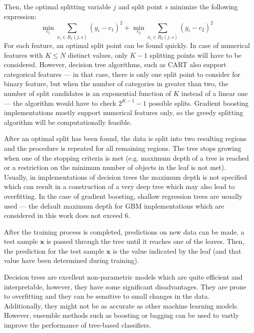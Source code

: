 \documentclass[magisterska, english]{pwr_wmat_praca_dyplomowa}
\theoremstyle{plain}
\numberwithin{theorem}{chapter}
\theoremstyle{definition}
\numberwithin{theorem}{chapter}
\begin{document}
Then, the optimal splitting variable $j$ and split point $s$ minimize the following expression:
\begin{equation}
    \min_{c_1} \sum_{x_i\in R_1(j,s)} (y_i - c_1)^2 + \min_{c_2} \sum_{x_i\in R_2(j,s)} (y_i - c_2)^2
\end{equation}
For each feature, an optimal split point can be found quickly. In case of numerical features with $K\le N$ distinct values, only $K-1$ splitting points will have to be considered. However, decision tree algorithms, such as CART also support categorical features --- in that case, there is only one split point to consider for binary feature, but when the number of categories in greater than two, the number of split candidates is an exponential function of $K$ instead of a linear one --- the algorithm would have to check $2^{K-1} - 1$ possible splits. Gradient boosting implementations mostly support numerical features only, so the greedy splitting algorithm will be computationally feasible. 

After an optimal split has been found, the data is split into two resulting regions and the procedure is repeated for all remaining regions. The tree stops growing when one of the stopping criteria is met (e.g. maximum depth of a tree is reached or a restriction on the minimum number of objects in the leaf is not met). Usually, in implementations of decision trees the maximum depth is not specified which can result in a construction of a very deep tree which may also lead to overfitting. In the case of gradient boosting, shallow regression trees are usually used --- the default maximum depth for GBM implementations which are considered in this work does not exceed 6.  

After the training process is completed, predictions on new data can be made. a test sample $\mathbf{x}$ is passed through the tree until it reaches one of the leaves. Then, the prediction for the test sample $\mathbf{x}$ is the value indicated by the leaf (and that value have been determined during training).

Decision trees are excellent non-parametric models which are quite efficient and interpretable, however, they have some significant disadvantages. They are prone to overfitting and they can be sensitive to small changes in the data. Additionally, they might not be as accurate as other machine learning models. However, ensemble methods such as boosting or bagging can be used to vastly improve the performance of tree-based classifiers. 
\end{document}
